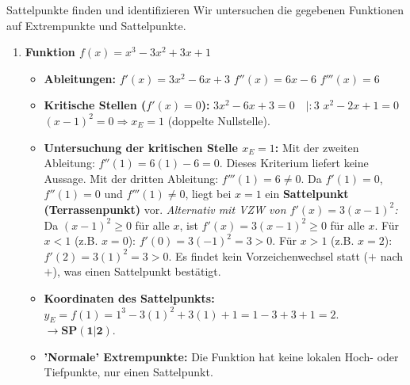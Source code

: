 \begin{loesungsumgebung}{Sattelpunkte finden und identifizieren}
Wir untersuchen die gegebenen Funktionen auf Extrempunkte und Sattelpunkte.

\begin{enumerate}[label=(\alph*)]
    \item \textbf{Funktion $f(x) = x^3 - 3x^2 + 3x + 1$}
    \begin{itemize}
        \item \textbf{Ableitungen:}
        $f'(x) = 3x^2 - 6x + 3$
        $f''(x) = 6x - 6$
        $f'''(x) = 6$
        \item \textbf{Kritische Stellen ($f'(x)=0$):}
        $3x^2 - 6x + 3 = 0 \quad | :3$
        $x^2 - 2x + 1 = 0$
        $(x-1)^2 = 0 \Rightarrow x_E = 1$ (doppelte Nullstelle).
        \item \textbf{Untersuchung der kritischen Stelle $x_E=1$:}
        Mit der zweiten Ableitung: $f''(1) = 6(1) - 6 = 0$. Dieses Kriterium liefert keine Aussage.
        Mit der dritten Ableitung: $f'''(1) = 6 \neq 0$.
        Da $f'(1)=0$, $f''(1)=0$ und $f'''(1) \neq 0$, liegt bei $x=1$ ein \textbf{Sattelpunkt (Terrassenpunkt)} vor.
        \textit{Alternativ mit VZW von $f'(x) = 3(x-1)^2$:}
        Da $(x-1)^2 \ge 0$ für alle $x$, ist $f'(x) = 3(x-1)^2 \ge 0$ für alle $x$.
        Für $x < 1$ (z.B. $x=0$): $f'(0) = 3(-1)^2 = 3 > 0$.
        Für $x > 1$ (z.B. $x=2$): $f'(2) = 3(1)^2 = 3 > 0$.
        Es findet kein Vorzeichenwechsel statt ($+$ nach $+$), was einen Sattelpunkt bestätigt.
        \item \textbf{Koordinaten des Sattelpunkts:}
        $y_E = f(1) = 1^3 - 3(1)^2 + 3(1) + 1 = 1 - 3 + 3 + 1 = 2$.
        $\rightarrow \mathbf{SP(1|2)}$.
        \item \textbf{'Normale' Extrempunkte:} Die Funktion hat keine lokalen Hoch- oder Tiefpunkte, nur einen Sattelpunkt.
    \end{itemize}


\end{enumerate}
\end{loesungsumgebung}
